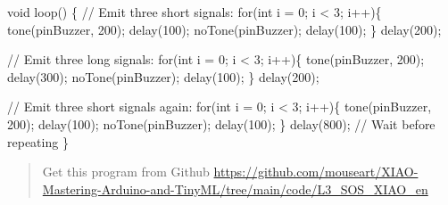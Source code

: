 \documentclass[
  letterpaper,
  DIV=11,
  numbers=noendperiod]{scrreprt}
\newenvironment{Shaded}{\begin{snugshade}}{\end{snugshade}}
\newcommand{\CommentTok}[1]{\textcolor[rgb]{0.37,0.37,0.37}{#1}}
\newcommand{\ControlFlowTok}[1]{\textcolor[rgb]{0.00,0.23,0.31}{#1}}
\newcommand{\DataTypeTok}[1]{\textcolor[rgb]{0.68,0.00,0.00}{#1}}
\newcommand{\DecValTok}[1]{\textcolor[rgb]{0.68,0.00,0.00}{#1}}
\newcommand{\NormalTok}[1]{\textcolor[rgb]{0.00,0.23,0.31}{#1}}
\newcommand{\OperatorTok}[1]{\textcolor[rgb]{0.37,0.37,0.37}{#1}}
\begin{document}
\begin{Shaded}
\begin{Highlighting}[]
\DataTypeTok{void}\NormalTok{ loop}\OperatorTok{()} \OperatorTok{\{}
    \CommentTok{// Emit three short signals:}
    \ControlFlowTok{for}\OperatorTok{(}\DataTypeTok{int}\NormalTok{ i }\OperatorTok{=} \DecValTok{0}\OperatorTok{;}\NormalTok{ i }\OperatorTok{\textless{}} \DecValTok{3}\OperatorTok{;}\NormalTok{ i}\OperatorTok{++)\{}
\NormalTok{        tone}\OperatorTok{(}\NormalTok{pinBuzzer}\OperatorTok{,} \DecValTok{200}\OperatorTok{);}
\NormalTok{        delay}\OperatorTok{(}\DecValTok{100}\OperatorTok{);}
\NormalTok{        noTone}\OperatorTok{(}\NormalTok{pinBuzzer}\OperatorTok{);}
\NormalTok{        delay}\OperatorTok{(}\DecValTok{100}\OperatorTok{);}
    \OperatorTok{\}}
\NormalTok{    delay}\OperatorTok{(}\DecValTok{200}\OperatorTok{);}

    \CommentTok{// Emit three long signals:}
    \ControlFlowTok{for}\OperatorTok{(}\DataTypeTok{int}\NormalTok{ i }\OperatorTok{=} \DecValTok{0}\OperatorTok{;}\NormalTok{ i }\OperatorTok{\textless{}} \DecValTok{3}\OperatorTok{;}\NormalTok{ i}\OperatorTok{++)\{}
\NormalTok{        tone}\OperatorTok{(}\NormalTok{pinBuzzer}\OperatorTok{,} \DecValTok{200}\OperatorTok{);}
\NormalTok{        delay}\OperatorTok{(}\DecValTok{300}\OperatorTok{);}
\NormalTok{        noTone}\OperatorTok{(}\NormalTok{pinBuzzer}\OperatorTok{);}
\NormalTok{        delay}\OperatorTok{(}\DecValTok{100}\OperatorTok{);}
    \OperatorTok{\}}
\NormalTok{    delay}\OperatorTok{(}\DecValTok{200}\OperatorTok{);}

    \CommentTok{// Emit three short signals again:}
    \ControlFlowTok{for}\OperatorTok{(}\DataTypeTok{int}\NormalTok{ i }\OperatorTok{=} \DecValTok{0}\OperatorTok{;}\NormalTok{ i }\OperatorTok{\textless{}} \DecValTok{3}\OperatorTok{;}\NormalTok{ i}\OperatorTok{++)\{}
\NormalTok{        tone}\OperatorTok{(}\NormalTok{pinBuzzer}\OperatorTok{,} \DecValTok{200}\OperatorTok{);}
\NormalTok{        delay}\OperatorTok{(}\DecValTok{100}\OperatorTok{);}
\NormalTok{        noTone}\OperatorTok{(}\NormalTok{pinBuzzer}\OperatorTok{);}
\NormalTok{        delay}\OperatorTok{(}\DecValTok{100}\OperatorTok{);}
    \OperatorTok{\}}
\NormalTok{    delay}\OperatorTok{(}\DecValTok{800}\OperatorTok{);} \CommentTok{// Wait before repeating}
\OperatorTok{\}}
\end{Highlighting}
\end{Shaded}

\begin{quote}
Get this program from Github
\url{https://github.com/mouseart/XIAO-Mastering-Arduino-and-TinyML/tree/main/code/L3_SOS_XIAO_en}
\end{quote}
\end{document}
